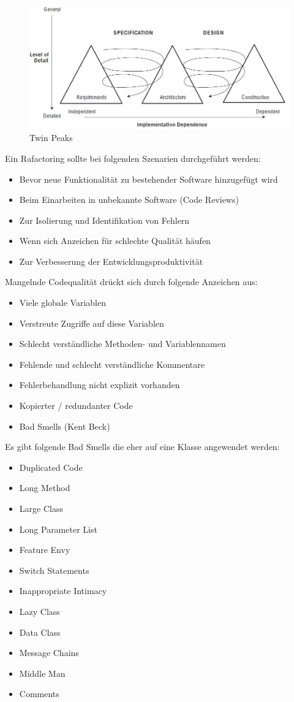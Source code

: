 \begin{figure}
\centering
\includegraphics[width=0.7\linewidth]{fig/twin-peaks}
\caption{Twin Peaks}
\label{fig:twin-peaks-1}
\end{figure}

Ein Rafactoring sollte bei folgenden Szenarien durchgeführt werden:
\begin{itemize}
	\item Bevor neue Funktionalität zu bestehender Software hinzugefügt wird
	\item Beim Einarbeiten in unbekannte Software (Code Reviews)
	\item Zur Isolierung und Identifikation von Fehlern
	\item Wenn sich Anzeichen für schlechte Qualität häufen
	\item Zur Verbesserung der Entwicklungsproduktivität
\end{itemize}
Mangelnde Codequalität drückt sich durch folgende Anzeichen aus:
\begin{itemize}
	\item Viele globale Variablen
	\item Verstreute Zugriffe auf diese Variablen
	\item Schlecht verständliche Methoden- und Variablennamen
	\item Fehlende und schlecht verständliche Kommentare
	\item Fehlerbehandlung nicht explizit vorhanden
	\item Kopierter / redundanter Code
	\item Bad Smells (Kent Beck)
\end{itemize}
Es gibt folgende Bad Smells die eher auf eine Klasse angewendet werden:
\begin{itemize}
	\item Duplicated Code
	\item Long Method
	\item Large Class
	\item Long Parameter List
	\item Feature Envy
	\item Switch Statements
	\item Inappropriate Intimacy
	\item Lazy Class
	\item Data Class
	\item Message Chains
	\item Middle Man
	\item Comments
\end{itemize}
